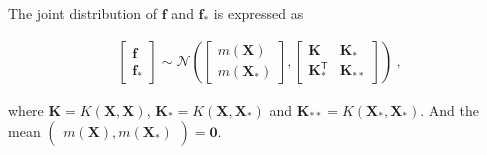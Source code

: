\documentclass[preprint,12pt]{elsarticle}
\begin{document}
The joint distribution of $\mathbf{f}$ and $\mathbf{f}_*$ is expressed as
\begin{ceqn}
    \begin{align}
       \begin{bmatrix}\mathbf{f} \\ \mathbf{f}_*\end{bmatrix} \sim \mathcal{N}\left(\begin{bmatrix}m(\mathbf{X})\\ m(\mathbf{X}_*)\end{bmatrix}, \begin{bmatrix}\mathbf{K} & \mathbf{K}_* \\ \mathbf{K}_*^\mathsf{T} & \mathbf{K}_{**}\end{bmatrix}\right) \ , \nonumber
    \end{align}
\end{ceqn}
where $\mathbf{K}=K(\mathbf{X}, \mathbf{X})$, $\mathbf{K}_* = K(\mathbf{X}, \mathbf{X}_*)$ and $\mathbf{K}_{**}=K(\mathbf{X}_*, \mathbf{X}_*)$. And the mean $\begin{pmatrix}m(\mathbf{X}), m(\mathbf{X}_*)\end{pmatrix} = \mathbf{0}$. 
\end{document}
